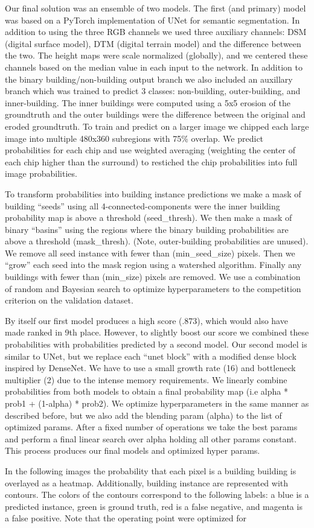 Our final solution was an ensemble of two models. The first (and primary) model was based on a PyTorch implementation of UNet for semantic segmentation. In addition to using the three RGB channels we used three auxiliary channels: DSM (digital surface model), DTM (digital terrain model) and the difference between the two. The height maps were scale normalized (globally), and we centered these channels based on the median value in each input to the network. In addition to the binary building/non-building output branch we also included an auxillary branch which was trained to predict 3 classes: non-building, outer-building, and inner-building. The inner buildings were computed using a 5x5 erosion of the groundtruth and the outer buildings were the difference between the original and eroded groundtruth. To train and predict on a larger image we chipped each large image into multiple 480x360 subregions with 75\% overlap. We predict probabilities for each chip and use weighted averaging (weighting the center of each chip higher than the surround) to restiched the chip probabilities into full image probabilities. 

To transform probabilities into building instance predictions we make a mask of building “seeds” using all 4-connected-components were the inner building probability map is above a threshold (seed_thresh). We then make a mask of binary “basins” using the  regions where the binary building probabilities are above a threshold (mask_thresh). (Note, outer-building probabilities are unused). We remove all seed instance with fewer than (min_seed_size) pixels. Then we “grow” each seed into the mask region using a watershed algorithm. Finally any buildings with fewer than (min_size) pixels are removed. We use a combination of random and Bayesian search to optimize hyperparameters to the competition criterion on the validation dataset. 

By itself our first model produces a high score (.873), which would also have made ranked in 9th place. However, to slightly boost our score we combined these probabilities with probabilities predicted by a second model. Our second model is similar to UNet, but we replace each “unet block” with a modified dense block inspired by DenseNet.  We have to use a small growth rate (16) and bottleneck multiplier (2)  due to the intense memory requirements. We linearly combine probabilities from both models to obtain a final probability map (i.e alpha * prob1 + (1-alpha) * prob2). We optimize hyperparameters in the same manner as described before, but we also add the blending param (alpha) to the list of optimized params. After a fixed number of operations we take the best params and perform a final linear search over alpha holding all other params constant. This process produces our final models and optimized hyper params. 

In the following images the probability that each pixel is a building building is overlayed as a heatmap. Additionally, building instance are represented with contours. The colors of the contours correspond to the following labels: a blue is a predicted instance, green is ground truth, red is a false negative, and magenta is a false positive. Note that the operating point were optimized for 


